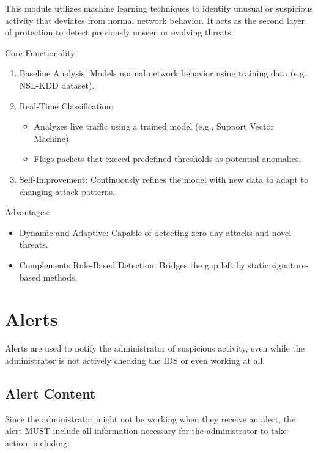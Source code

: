 \documentclass[oneside, english]{reports/assets/sdqtechreport}
\begin{document}
This module utilizes machine learning techniques to identify unusual or
suspicious activity that deviates from normal network behavior. It acts as the
second layer of protection to detect previously unseen or evolving threats.

Core Functionality:
\begin{enumerate}
	\item Baseline Analysis: Models normal network behavior using training data (e.g.,
	      NSL-KDD dataset).
	\item Real-Time Classification:
	      \begin{itemize}
		      \item Analyzes live traffic using a trained model (e.g., Support Vector Machine).
		      \item Flags packets that exceed predefined thresholds as potential anomalies.
	      \end{itemize}
	\item Self-Improvement: Continuously refines the model with new data to adapt to
	      changing attack patterns.
\end{enumerate}

Advantages:
\begin{itemize}
	\item Dynamic and Adaptive: Capable of detecting zero-day attacks and novel threats.
	\item Complements Rule-Based Detection: Bridges the gap left by static
	      signature-based methods.
\end{itemize}

\chapter{Alerts}
\label{chap:Alerts}

Alerts are used to notify the administrator of suspicious activity, even while
the administrator is not actively checking the IDS or even working at all.

\section{Alert Content}
\label{sec:AlertContent}

Since the administrator might not be working when they receive an alert, the
alert MUST include all information necessary for the administrator to take
action, including:
\end{document}
